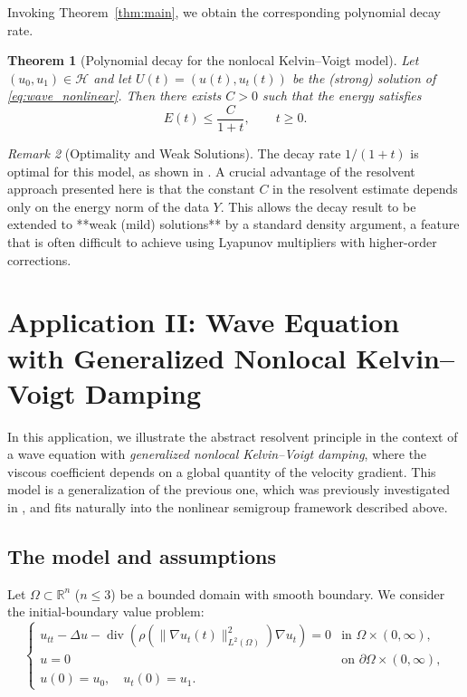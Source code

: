 \documentclass[11pt,reqno]{amsart}
\newtheorem{theorem}{Theorem}[section]
\theoremstyle{remark}
\newtheorem{remark}[theorem]{Remark}
\newcommand{\R}{\mathbb{R}}
\begin{document}
Invoking Theorem~\ref{thm:main}, we obtain the corresponding polynomial decay rate.

\begin{theorem}[Polynomial decay for the nonlocal Kelvin--Voigt model]\label{thm:wave_decay}
Let $(u_0,u_1)\in\mathcal H$ and let $U(t)=(u(t),u_t(t))$ be the (strong) solution of
\eqref{eq:wave_nonlinear}. Then there exists $C>0$ such that the energy satisfies
\[
E(t)\le \frac{C}{1+t},\qquad t\ge0.
\]
\end{theorem}

\begin{remark}[Optimality and Weak Solutions]
The decay rate $1/(1+t)$ is optimal for this model, as shown in \cite{Cavalcanti2025}. A crucial advantage of the resolvent approach presented here is that the constant $C$ in the resolvent estimate depends only on the energy norm of the data $Y$. This allows the decay result to be extended to **weak (mild) solutions** by a standard density argument, a feature that is often difficult to achieve using Lyapunov multipliers with higher-order corrections.
\end{remark}





\section{Application II: Wave Equation with Generalized Nonlocal Kelvin--Voigt Damping}
\label{sec:KV_nonlocal}

In this application, we illustrate the abstract resolvent principle in the
context of a wave equation with \emph{generalized nonlocal Kelvin--Voigt damping}, where the
viscous coefficient depends on a global quantity of the velocity gradient.
This model is a generalization of the previous one, which was previously investigated in \cite{Cavalcanti2025},
and fits naturally into the nonlinear semigroup framework described above.

\subsection{The model and assumptions}
\label{subsec:KV_nonlocal_model}

Let $\Omega\subset\R^n$ ($n\le 3$) be a bounded domain with smooth boundary.
We consider the initial-boundary value problem:
\begin{equation}\label{eq:KV_nonlocal}
\begin{cases}
u_{tt}-\Delta u-\operatorname{div}\!\left(
\rho\!\left(\|\nabla u_t(t)\|_{L^2(\Omega)}^2\right)\nabla u_t
\right)=0
&\text{in }\Omega\times(0,\infty),\\
u=0 &\text{on }\partial\Omega\times(0,\infty),\\
u(0)=u_0,\quad u_t(0)=u_1.
\end{cases}
\end{equation}
\end{document}
